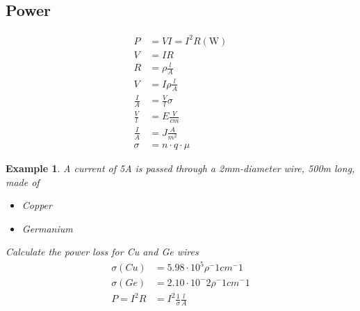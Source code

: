 \documentclass{article}
\newtheorem{theorem}{Example}
\begin{document}
\subsection*{Power}
\begin{equation*}
    \begin{aligned}
        P           & = VI = I^2 R (\si{\watt}) \\
        V           & = IR                      \\
        R           & = \rho \frac{l}{A}        \\
        V           & = I\rho \frac{l}{A}       \\
        \frac{I}{A} & = \frac{V}{l}\sigma       \\
        \frac{V}{l} & = E \frac{V}{cm}          \\
        \frac{I}{A} & = J \frac{A}{m^2}         \\
        \sigma      & = n \cdot q \cdot \mu
    \end{aligned}
\end{equation*}

\begin{theorem}
    A current of 5A is passed through a 2mm-diameter wire, 500m long, made of
    \begin{itemize}
        \item Copper
        \item Germanium
    \end{itemize}
    Calculate the power loss for Cu and Ge wires
    \begin{equation*}
        \begin{aligned}
            \sigma(Cu) & = 5.98\cdot 10^5 \rho ^-1 cm^-1    \\
            \sigma(Ge) & = 2.10\cdot 10^-2 \rho ^-1 cm^-1   \\
            P=I^2R     & = I^2 \frac{1}{\sigma} \frac{l}{A}
        \end{aligned}
    \end{equation*}
\end{theorem}
\end{document}
